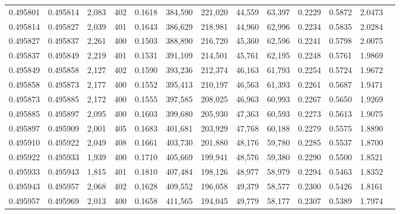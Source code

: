 \begin{tabular}{rrrrrrrrrrrrr}
0.495801 & 0.495814 & 2,083 & 402 &                                     0.1618 & 384,590 & 221,020 &  44,559 &  63,397 & 0.2229 & 0.5872 & 2.0473 \\
0.495814 & 0.495827 & 2,039 & 401 &                                     0.1643 & 386,629 & 218,981 &  44,960 &  62,996 & 0.2234 & 0.5835 & 2.0284 \\
0.495827 & 0.495837 & 2,261 & 400 &                                     0.1503 & 388,890 & 216,720 &  45,360 &  62,596 & 0.2241 & 0.5798 & 2.0075 \\
0.495837 & 0.495849 & 2,219 & 401 &                                     0.1531 & 391,109 & 214,501 &  45,761 &  62,195 & 0.2248 & 0.5761 & 1.9869 \\
0.495849 & 0.495858 & 2,127 & 402 &                                     0.1590 & 393,236 & 212,374 &  46,163 &  61,793 & 0.2254 & 0.5724 & 1.9672 \\
0.495858 & 0.495873 & 2,177 & 400 &                                     0.1552 & 395,413 & 210,197 &  46,563 &  61,393 & 0.2261 & 0.5687 & 1.9471 \\
0.495873 & 0.495885 & 2,172 & 400 &                                     0.1555 & 397,585 & 208,025 &  46,963 &  60,993 & 0.2267 & 0.5650 & 1.9269 \\
0.495885 & 0.495897 & 2,095 & 400 &                                     0.1603 & 399,680 & 205,930 &  47,363 &  60,593 & 0.2273 & 0.5613 & 1.9075 \\
0.495897 & 0.495909 & 2,001 & 405 &                                     0.1683 & 401,681 & 203,929 &  47,768 &  60,188 & 0.2279 & 0.5575 & 1.8890 \\
0.495910 & 0.495922 & 2,049 & 408 &                                     0.1661 & 403,730 & 201,880 &  48,176 &  59,780 & 0.2285 & 0.5537 & 1.8700 \\
0.495922 & 0.495933 & 1,939 & 400 &                                     0.1710 & 405,669 & 199,941 &  48,576 &  59,380 & 0.2290 & 0.5500 & 1.8521 \\
0.495933 & 0.495943 & 1,815 & 401 &                                     0.1810 & 407,484 & 198,126 &  48,977 &  58,979 & 0.2294 & 0.5463 & 1.8352 \\
0.495943 & 0.495957 & 2,068 & 402 &                                     0.1628 & 409,552 & 196,058 &  49,379 &  58,577 & 0.2300 & 0.5426 & 1.8161 \\
0.495957 & 0.495969 & 2,013 & 400 &                                     0.1658 & 411,565 & 194,045 &  49,779 &  58,177 & 0.2307 & 0.5389 & 1.7974 \\

\end{tabular}
